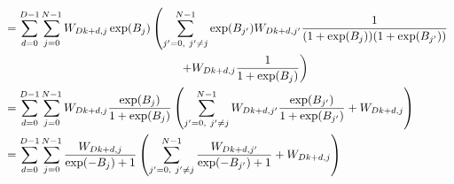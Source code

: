 \documentclass[12pt]{article}
\begin{document}
\begin{align*}
&= \sum_{d=0}^{D-1} \sum_{j=0}^{N-1}  W_{Dk+d,j} \exp(B_j) \left(  \sum_{j'=0,\ j'\neq j}^{N-1} \exp(B_{j'}) W_{Dk+d,j'} \frac{1}{(1+\exp(B_j))(1+\exp(B_{j'}))} \right.\\
& \hspace*{5.25cm} \left. + W_{Dk+d,j} \frac{1}{1+\exp(B_j)} \right)\\
&= \sum_{d=0}^{D-1} \sum_{j=0}^{N-1}  W_{Dk+d,j} \frac{\exp(B_j)}{1+\exp(B_j)} \left( \sum_{j'=0,\ j'\neq j}^{N-1} W_{Dk+d,j'} \frac{\exp(B_{j'})}{1+\exp(B_{j'})} + W_{Dk+d,j} \right)\\
&= \sum_{d=0}^{D-1} \sum_{j=0}^{N-1} \frac{W_{Dk+d,j}}{\exp(-B_j)+1} \left( \sum_{j'=0,\ j'\neq j}^{N-1} \frac{W_{Dk+d,j'}}{\exp(-B_{j'})+1} + W_{Dk+d,j} \right)\\
\end{align*}
\end{document}
